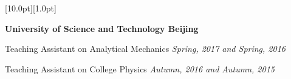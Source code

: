 \documentclass[12pt,a4paper,utf8]{report}
\begin{document}
\begin{minipage}[t]{16cm}
    \colorbox{subtitlecolor}{\raisebox{0pt}[10.0pt][1.0pt]{
        \textcolor{white}{\textsf{}}}}
\end{minipage}\par
\vspace{0.2cm}\hspace{0.5cm}
\begin{minipage}[t]{15cm}
    {{\textbf{University of Science and Technology Beijing}}}\par
    \quad Teaching Assistant on Analytical Mechanics\hfill
    {\em{Spring, 2017 and Spring, 2016}}\par
    \quad Teaching Assistant on College Physics\hfill
    {\em{Autumn, 2016 and Autumn, 2015}}\par
\end{minipage}\par
\vspace{0.4cm}
\end{document}
